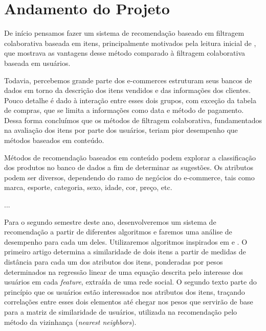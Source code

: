 \chapter[Andamento do Projeto]{Andamento do Projeto}
\label{chap:andamento_do_projeto}


De início pensamos fazer um sistema de recomendação baseado em filtragem colaborativa baseada em itens, principalmente motivados pela leitura inicial de \cite{linden2003amazon}, que mostrava as vantagens desse método comparado à filtragem colaborativa baseada em usuários. 

Todavia, percebemos grande parte dos e-commerces estruturam seus bancos de dados em torno da descrição dos itens vendidos e das informações dos clientes. Pouco detalhe é dado à interação entre esses dois grupos, com exceção da tabela de compras, que se limita a informações como data e método de pagamento. Dessa forma concluímos que os métodos de filtragem colaborativa, fundamentados na avaliação dos itens por parte dos usuários, teriam pior desempenho que métodos baseados em conteúdo.

Métodos de recomendação baseados em conteúdo podem explorar a classificação dos produtos no banco de dados a fim de determinar as sugestões. Os atributos podem ser diversos, dependendo do ramo de negócios do e-commerce, tais como marca, esporte, categoria, sexo, idade, cor, preço, etc.

...

Para o segundo semestre deste ano, desenvolveremos um sistema de recomendação a partir de diferentes algoritmos e faremos uma análise de desempenho  para cada um deles. Utilizaremos algoritmos inspirados em \cite{debnath2008feature} e \cite{symeonidis2007feature}. O primeiro artigo determina a similaridade de dois itens a partir de medidas de distância para cada um dos atributos dos itens, ponderadas por pesos determinados na regressão linear de uma equação descrita pelo interesse dos usuários em cada \textit{feature}, extraída de uma rede social. O segundo texto parte do princípio que os usuários estão interessados nos atributos dos itens, traçando correlações entre esses dois elementos até chegar nos pesos que servirão de base para a matriz de similaridade de usuários, utilizada na recomendação pelo método da vizinhança (\textit{nearest neighbors}).


